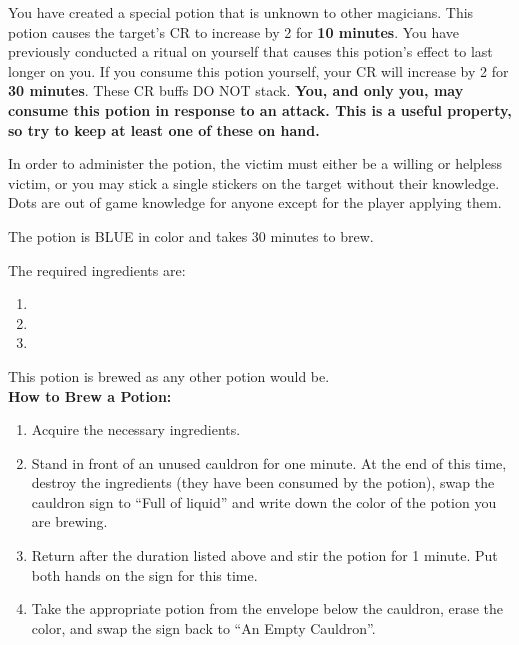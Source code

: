 \documentclass[green]{NeptuneBall}
\begin{document}
\name{\gBuff{}}

You have created a special potion that is unknown to other magicians. This potion causes the target's CR to increase by 2 for {\bf 10 minutes}.  You have previously conducted a ritual on yourself that causes this potion's effect to last longer on you. If you consume this potion yourself, your CR will increase by 2 for {\bf 30 minutes}. These CR buffs DO NOT stack. {\bf You, and only you, may consume this potion in response to an attack. This is a useful property, so try to keep at least one of these on hand.}

In order to administer the potion, the victim must either be a willing or helpless victim, or you may stick a single stickers on the target without their knowledge. Dots are out of game knowledge for anyone except for the player applying them.

The potion is BLUE in color and takes 30 minutes to brew. 

The required ingredients are:
\begin{enumerate}
\item \iManOfWar{}
\item \iTeeth{}
\item \iSwordfish{}
\end{enumerate}

This potion is brewed as any other potion would be.\\

{\bf How to Brew a Potion:}\\ %
\begin{enumerate}
  \item Acquire the necessary ingredients.
  \item Stand in front of an unused cauldron for one minute. At the end of this time, destroy the ingredients (they have been consumed by the potion), swap the cauldron sign to ``Full of liquid'' and write down the color of the potion you are brewing.
  \item Return after the duration listed above and stir the potion for 1 minute. Put both hands on the sign for this time.
  \item Take the appropriate potion from the envelope below the cauldron, erase the color, and swap the sign back to ``An Empty Cauldron''.
\end{enumerate}
\end{document}
